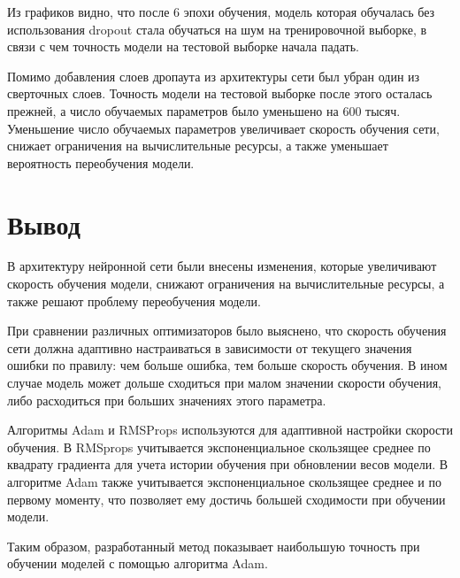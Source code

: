 Из графиков видно, что после 6 эпохи обучения, модель которая обучалась без использования dropout стала обучаться на шум на тренировочной выборке, в связи с чем точность модели на тестовой выборке начала падать.

Помимо добавления слоев дропаута из архитектуры сети был убран один из сверточных слоев. Точность модели на тестовой выборке после этого осталась прежней, а число обучаемых параметров было уменьшено на 600 тысяч. Уменьшение число обучаемых параметров увеличивает скорость обучения сети, снижает ограничения на вычислительные ресурсы, а также уменьшает вероятность переобучения модели.

\section{Вывод}
В архитектуру нейронной сети были внесены изменения, которые увеличивают скорость обучения модели, снижают ограничения на вычислительные ресурсы, а также решают проблему переобучения модели.

При сравнении различных оптимизаторов было выяснено, что скорость обучения сети должна адаптивно настраиваться в зависимости от текущего значения ошибки по правилу: чем больше ошибка, тем больше скорость обучения. В ином случае модель может дольше сходиться при малом значении скорости обучения, либо расходиться при больших значениях этого параметра.

Алгоритмы Adam и RMSProps используются для адаптивной настройки скорости обучения. В RMSprops учитывается экспоненциальное скользящее среднее по квадрату градиента для учета истории обучения при обновлении весов модели. В алгоритме Adam также учитывается экспоненциальное скользящее среднее и по первому моменту, что позволяет ему достичь большей сходимости при обучении модели.

Таким образом, разработанный метод показывает наибольшую точность при обучении моделей с помощью алгоритма Adam.
